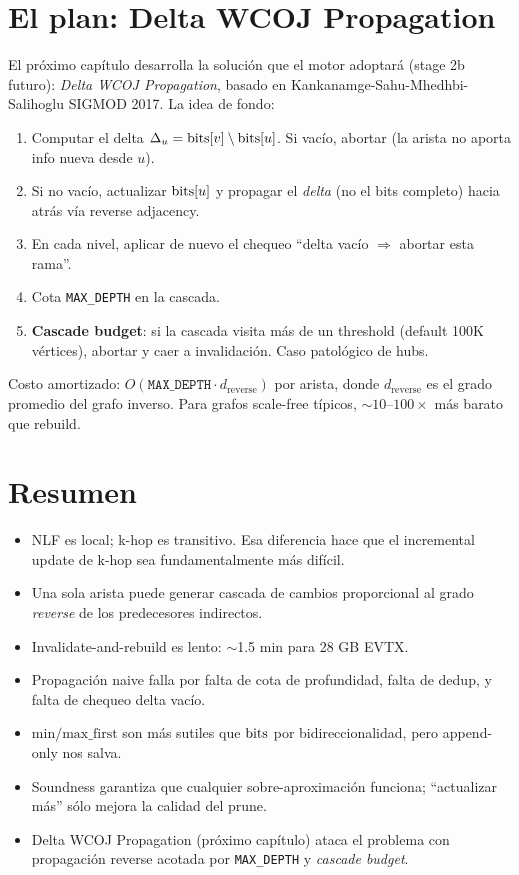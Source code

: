 \section{El plan: Delta WCOJ Propagation}

El próximo capítulo desarrolla la solución que el motor adoptará
(stage 2b futuro): \emph{Delta WCOJ Propagation}, basado en
Kankanamge-Sahu-Mhedhbi-Salihoglu SIGMOD 2017. La idea de fondo:

\begin{enumerate}
    \item Computar el delta \(\Delta_u = \mathrm{bits}[v] \setminus
    \mathrm{bits}[u]\). Si vacío, abortar (la arista no aporta info nueva
    desde \(u\)).
    \item Si no vacío, actualizar \(\mathrm{bits}[u]\) y propagar el
    \emph{delta} (no el bits completo) hacia atrás vía reverse
    adjacency.
    \item En cada nivel, aplicar de nuevo el chequeo
    ``delta vacío $\Rightarrow$ abortar esta rama''.
    \item Cota \texttt{MAX\_DEPTH} en la cascada.
    \item \textbf{Cascade budget}: si la cascada visita más de un
    threshold (default 100K vértices), abortar y caer a
    invalidación. Caso patológico de hubs.
\end{enumerate}

\noindent
Costo amortizado: \(O(\texttt{MAX\_DEPTH} \cdot
d_{\mathrm{reverse}})\) por arista, donde \(d_{\mathrm{reverse}}\)
es el grado promedio del grafo inverso. Para grafos scale-free
típicos, \(\sim 10\)--\(100\times\) más barato que rebuild.

\section{Resumen}

\begin{itemize}
    \item NLF es local; k-hop es transitivo. Esa diferencia hace
    que el incremental update de k-hop sea fundamentalmente más
    difícil.
    \item Una sola arista puede generar cascada de cambios
    proporcional al grado \emph{reverse} de los predecesores
    indirectos.
    \item Invalidate-and-rebuild es lento: $\sim$1.5 min para 28 GB
    EVTX.
    \item Propagación naive falla por falta de cota de profundidad,
    falta de dedup, y falta de chequeo delta vacío.
    \item \(\mathrm{min/max\_first}\) son más sutiles que
    \(\mathrm{bits}\) por bidireccionalidad, pero append-only nos salva.
    \item Soundness garantiza que cualquier sobre-aproximación
    funciona; ``actualizar más'' sólo mejora la calidad del
    prune.
    \item Delta WCOJ Propagation (próximo capítulo) ataca el
    problema con propagación reverse acotada por
    \texttt{MAX\_DEPTH} y \emph{cascade budget}.
\end{itemize}

